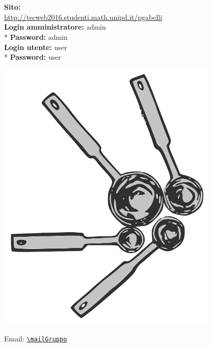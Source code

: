 \thispagestyle{empty}

\begin{titlepage}

	\begin{center}
		\dataUM \\
		\textbf{
			\uni \\
			\cdl \\
			\uniAA \\
		}
		\HRule \\[0.4cm]
			\begin{Huge}
				{\huge \bfseries \titoloDocumento}\\[0.4cm]
			\end{Huge}
		\HRule \\[2.5cm]
		
		\vspace{1cm}
		\textbf{Sito:} \\
		\url{http://tecweb2016.studenti.math.unipd.it/pgabelli} \\
		\vspace{1cm}
		\textbf{Login amministratore:} admin \\*
		\textbf{Password:} admin \\
		\textbf{Login utente:} user \\*
		\textbf{Password:} user \\

		
		
		\begin{center}
			\includegraphics[scale=0.75]{./sezioni/img/Logo.png}
		\end{center}
		Email: 
		\href{mailto:\mailGruppo}{\nolinkurl{\mailGruppo} } \\
		\vspace{3cm}
		


\end{center}
\end{titlepage}
